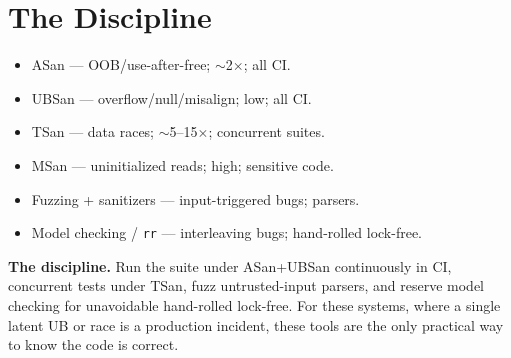 \section{The Discipline}
\begin{itemize}
\item ASan --- OOB/use-after-free; $\sim$2$\times$; all CI.
\item UBSan --- overflow/null/misalign; low; all CI.
\item TSan --- data races; $\sim$5--15$\times$; concurrent suites.
\item MSan --- uninitialized reads; high; sensitive code.
\item Fuzzing + sanitizers --- input-triggered bugs; parsers.
\item Model checking / \texttt{rr} --- interleaving bugs; hand-rolled lock-free.
\end{itemize}

\textbf{The discipline.} Run the suite under ASan+UBSan continuously in CI, concurrent tests under TSan, fuzz untrusted-input parsers, and reserve model checking for unavoidable hand-rolled lock-free. For these systems, where a single latent UB or race is a production incident, these tools are the only practical way to know the code is correct.
